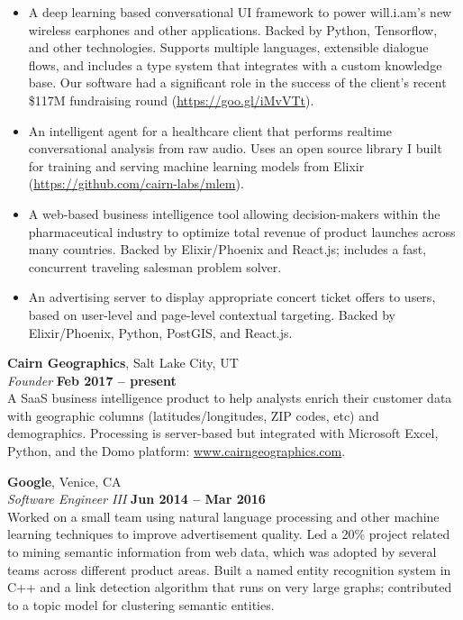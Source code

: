 \documentclass[margin,line]{resume}
\begin{document}
\begin{resume}
    \begin{itemize}
    \item A deep learning based conversational UI framework to power
      will.i.am's new wireless earphones and other applications. Backed by
      Python, Tensorflow, and other technologies. Supports multiple languages,
      extensible dialogue flows, and includes a type system that integrates with
      a custom knowledge base. Our software had a significant role in the
      success of the client's recent \$117M fundraising round
      (\url{https://goo.gl/iMvVTt}).
    \item An intelligent agent for a healthcare client that performs realtime
      conversational analysis from raw audio. Uses an open source library I
      built for training and serving machine learning models from Elixir
      (\url{https://github.com/cairn-labs/mlem}).
    \item A web-based business intelligence tool allowing decision-makers
      within the pharmaceutical industry to optimize total revenue of product
      launches across many countries. Backed by Elixir/Phoenix and React.js;
      includes a fast, concurrent traveling salesman problem solver.
    \item An advertising server to display appropriate concert ticket offers
      to users, based on user-level and page-level contextual targeting. Backed
      by Elixir/Phoenix, Python, PostGIS, and React.js.
    \end{itemize}

    \textbf{Cairn Geographics}, Salt Lake City, UT \vspace{2mm}\\\vspace{1mm}%
    \textsl{Founder} \hfill \textbf{Feb 2017 -- present}\\
    A SaaS business intelligence product to help analysts enrich their customer
    data with geographic columns (latitudes/longitudes, ZIP codes, etc) and
    demographics. Processing is server-based but integrated with Microsoft
    Excel, Python, and the Domo platform: \url{www.cairngeographics.com}.

    \textbf{Google}, Venice, CA \vspace{2mm}\\\vspace{1mm}%
    \textsl{Software Engineer III} \hfill \textbf{Jun 2014 -- Mar 2016}\\
    Worked on a small team using natural language processing and other machine
    learning techniques to improve advertisement quality. Led a 20\% project
    related to mining semantic information from web data, which was adopted by
    several teams across different product areas. Built a named entity
    recognition system in C++ and a link detection algorithm that runs on very
    large graphs; contributed to a topic model for clustering semantic entities.


\end{resume}
\end{document}
